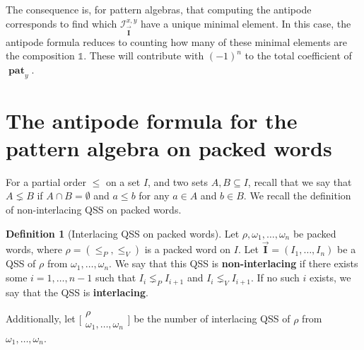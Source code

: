 \documentclass[submission]{FPSAC2023}
\theoremstyle{definition}
\newtheorem{defin}[thm]{Definition}
\newcommand{\III}{\vec{\mathbf{I}}}
\DeclareMathOperator{\pat}{\mathbf{pat}}
\begin{document}



The consequence is, for pattern algebras, that computing the antipode corresponds to find which $\mathcal I_{\III}^{x, y}$ have a unique minimal element.
In this case, the antipode formula reduces to counting how many of these minimal elements are the composition $\mathbb{1}$.
These will contribute with $(-1)^n$ to the total coefficient of $\pat_y$.

\section{The antipode formula for the pattern algebra on packed words\label{sec:formula_packed}}
For a partial order $\leq$ on a set $I$, and two sets $A, B \subseteq I$, recall that we say that $A \lneq B$ if $A\cap B = \emptyset$ and $a \leq b$ for any $a \in A$ and $b \in B$.
We recall the definition of non-interlacing QSS on packed words.

\begin{defin}[Interlacing QSS on packed words]
Let $\rho, \omega_1, \dots, \omega_n$ be packed words, where $\rho = (\leq_P, \leq_V)$ is a packed word on $I$.
Let $\III = (I_1, \dots, I_n)$ be a QSS of $\rho$ from $\omega_1, \dots, \omega_n$.
We say that this QSS is \textbf{non-interlacing} if there exists some $i = 1, \dots, n-1$ such that $I_i \lneq_P I_{i+1}$ and $I_i \lneq_V I_{i+1}$.
If no such $i$ exists, we say that the QSS is \textbf{interlacing}.\vspace{.05in}


Additionally, let $ \bigl[\!\begin{smallmatrix} \rho  \\ \omega_1, \dots, \omega_n \end{smallmatrix}\!\bigr]$ be the number of interlacing QSS of $\rho$ from $\omega_1, \dots, \omega_n$.
\end{defin}
\end{document}
